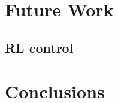 \section{Future Work}\label{sec:future_work}

  \subsection{RL control}

\section{Conclusions}\label{sec:conclusions}


